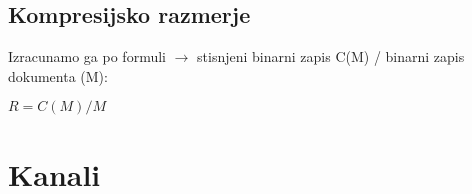 \documentclass{article}
\begin{document}
\begin{multicols}{3}
\subsection{Kompresijsko razmerje}
Izracunamo ga po formuli $\rightarrow$ stisnjeni binarni zapis C(M) / binarni zapis dokumenta (M):
\begin{center}
    \begin{math}
        R = C(M) / M
    \end{math}
\end{center}

\section{Kanali}

\end{multicols}
\end{document}
